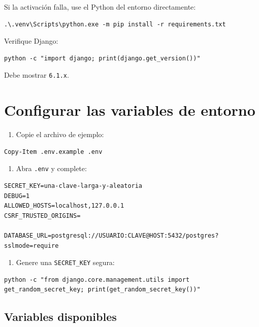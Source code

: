 \documentclass[11pt,a4paper]{article}
\newcommand{\campo}[1]{\texttt{\small #1}}
\begin{document}
Si la activación falla, use el Python del entorno directamente:

\begin{lstlisting}
.\.venv\Scripts\python.exe -m pip install -r requirements.txt
\end{lstlisting}

Verifique Django:

\begin{lstlisting}
python -c "import django; print(django.get_version())"
\end{lstlisting}

Debe mostrar \campo{6.1.x}.

\section{Configurar las variables de entorno}

\begin{enumerate}[leftmargin=1.4em]
  \item Copie el archivo de ejemplo:
\end{enumerate}

\begin{lstlisting}
Copy-Item .env.example .env
\end{lstlisting}

\begin{enumerate}[leftmargin=1.4em,start=2]
  \item Abra \campo{.env} y complete:
\end{enumerate}

\begin{lstlisting}
SECRET_KEY=una-clave-larga-y-aleatoria
DEBUG=1
ALLOWED_HOSTS=localhost,127.0.0.1
CSRF_TRUSTED_ORIGINS=

DATABASE_URL=postgresql://USUARIO:CLAVE@HOST:5432/postgres?sslmode=require
\end{lstlisting}

\begin{enumerate}[leftmargin=1.4em,start=3]
  \item Genere una \campo{SECRET\_KEY} segura:
\end{enumerate}

\begin{lstlisting}
python -c "from django.core.management.utils import get_random_secret_key; print(get_random_secret_key())"
\end{lstlisting}

\subsection{Variables disponibles}
\end{document}
